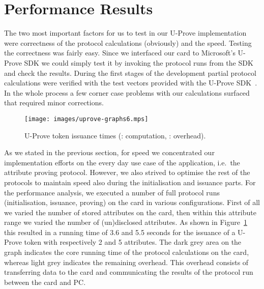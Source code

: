 \section{Performance Results}


The two most important factors for us to test in our U-Prove
implementation were correctness of the protocol calculations
(obviously) and the speed. Testing the correctness was fairly
easy. Since we interfaced our card to Microsoft's U-Prove SDK we
could simply test it by invoking the protocol runs from the SDK and
check the results. During the first stages of the development partial
protocol calculations were verified with the test vectors provided with the
U-Prove SDK~\cite{U-Prove_Vectors2011}. In the whole process a few
corner case problems with our calculations surfaced that required
minor corrections.

\begin{figure}
  \centering
  \texttt{[image: images/uprove-graphs6.mps]}
  \caption[U-Prove token issuance times.]{
    U-Prove token issuance times
    (: computation,
      : overhead).}
  \label{fig:issue}
\end{figure}

As we stated in the previous section, for speed we concentrated our
implementation efforts on the every day use case of the application, i.e.\ the
attribute proving protocol. However, we also strived to optimise the rest
of the protocols to maintain speed also during the initialisation and
issuance parts. For the performance analysis, we executed a number of full
protocol runs (initialisation, issuance, proving) on the card in various
configurations. First of all we varied the number of stored
attributes on the card, then within this attribute range we varied the
number of (un)disclosed attributes. As shown in Figure~\ref{fig:issue} this
resulted in a running time of 3.6 and 5.5 seconds for the issuance of a
U-Prove token with respectively 2 and 5 attributes.
The dark grey area on the graph indicates the core running time of the
protocol calculations on the card, whereas light grey indicates the
remaining overhead. This overhead consists of transferring data to the card
and communicating the results of the protocol run between the card and PC.

